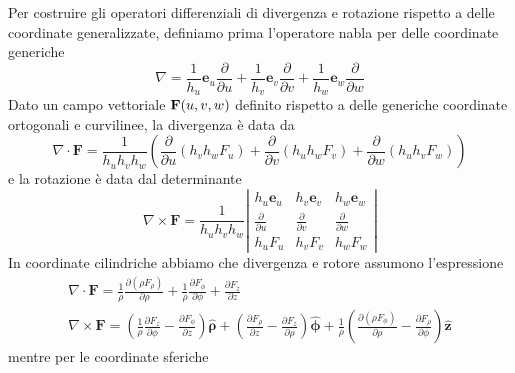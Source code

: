 Per costruire gli operatori differenziali di divergenza e rotazione rispetto a delle coordinate generalizzate, definiamo prima l'operatore nabla per delle coordinate generiche 
\begin{equation}
	\nabla=\frac{1}{h_u} \mathbf{e}_u \frac{\partial}{\partial u}+\frac{1}{h_v} \mathbf{e}_v \frac{\partial}{\partial v}+\frac{1}{h_w} \mathbf{e}_w \frac{\partial}{\partial w}
\end{equation}
Dato un campo vettoriale $\bold{F}(u,v,w)$ definito rispetto a delle generiche coordinate ortogonali e curvilinee, la divergenza \`e data da
\begin{equation}
	\nabla \cdot \mathbf{F}=\frac{1}{h_u h_v h_w}\left(\frac{\partial}{\partial u}\left(h_v h_w F_u\right)+\frac{\partial}{\partial v}\left(h_u h_w F_v\right)+\frac{\partial}{\partial w}\left(h_u h_v F_w\right)\right)
\end{equation}
e la rotazione \`e data dal determinante 
\begin{equation}
	\nabla \times \mathbf{F}=\frac{1}{h_u h_v h_w}\left|\begin{array}{ccc}
h_u \mathbf{e}_u & h_v \mathbf{e}_v & h_w \mathbf{e}_w \\
\frac{\partial}{\partial u} & \frac{\partial}{\partial v} & \frac{\partial}{\partial w} \\
h_u F_u & h_v F_v & h_w F_w
\end{array}\right|
\end{equation}
In coordinate cilindriche abbiamo che divergenza e rotore assumono l'espressione
\begin{equation*}
	\begin{aligned}
		&\nabla \cdot \mathbf{F}=\frac{1}{\rho} \frac{\partial\left(\rho F_\rho\right)}{\partial \rho}+\frac{1}{\rho} \frac{\partial F_\phi}{\partial \phi}+\frac{\partial F_z}{\partial z} \\[0.5cm]
		& \nabla \times \mathbf{F}=\left(\frac{1}{\rho} \frac{\partial F_z}{\partial \phi}-\frac{\partial F_\phi}{\partial z}\right) \hat{\boldsymbol{\rho}}+\left(\frac{\partial F_\rho}{\partial z}-\frac{\partial F_z}{\partial \rho}\right) \hat{\boldsymbol{\phi}}+\frac{1}{\rho}\left(\frac{\partial\left(\rho F_\phi\right)}{\partial \rho}-\frac{\partial F_\rho}{\partial \phi}\right) \hat{\mathbf{z}}&
	\end{aligned}
\end{equation*}
mentre per le coordinate sferiche 
